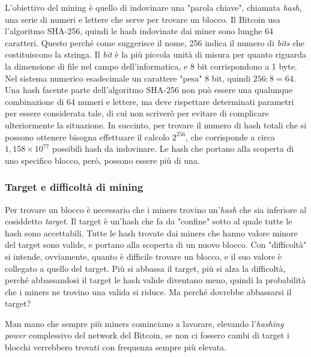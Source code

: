 \documentclass {article}
\begin{document}
L'obiettivo del mining è quello di indovinare una "parola chiave", chiamata \textit{hash}, una serie di numeri e lettere che serve per trovare un blocco.
Il Bitcoin usa l'algoritmo SHA-256, quindi le hash indovinate dai miner sono lunghe 64 caratteri.
Questo perché come suggerisce il nome, 256 indica il numero di \textit{bits} che costituiscono la stringa.
Il \textit{bit} è la più piccola unità di misura per quanto riguarda la dimensione di file nel campo dell'informatica, e 8 bit corrispondono a 1 byte.
Nel sistema numerico esadecimale un carattere "pesa" 8 bit, quindi $256 : 8 = 64$.
Una hash facente parte dell'algoritmo SHA-256 non può essere una qualunque combinazione di 64 numeri e lettere, ma deve rispettare determinati parametri per essere considerata tale, di cui non scriverò per evitare di complicare ulteriormente la situazione.
In succinto, per trovare il numero di hash totali che si possono ottenere bisogna effettuare il  calcolo $2^{256}$, che corrisponde a circa $1,158 \times 10^{77}$ possibili hash da indovinare.
Le hash che portano alla scoperta di uno specifico blocco, però, possono essere più di una.

\subsubsection {Target e difficoltà di mining}

Per trovare un blocco è necessario che i miners trovino un'\textit{hash} che sia inferiore al cosiddetto \textit{target}. Il target è un'hash che fa da "confine" sotto al quale tutte le hash sono accettabili.
Tutte le hash trovate dai miners che hanno valore minore del target sono valide, e portano alla scoperta di un nuovo blocco.
Con "difficoltà" si intende, ovviamente, quanto è difficile trovare un blocco, e il suo valore è collegato a quello del target.
Più si abbassa il target, più si alza la difficoltà, perché abbassandosi il target le hash valide diventano meno, quindi la probabilità che i miners ne trovino una valida si riduce.
Ma perché dovrebbe abbassarsi il target?

Man mano che sempre più miners cominciano a lavorare, elevando l'\textit{hashing power} complessivo del network del Bitcoin, se non ci fossero cambi di target i blocchi verrebbero trovati con frequenza sempre più elevata.
\end{document}
